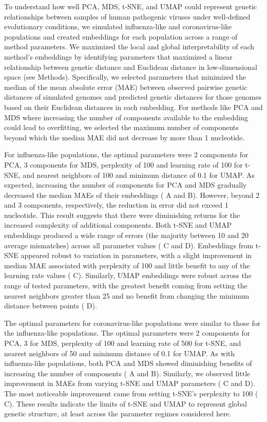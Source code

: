 \documentclass[10pt,letterpaper]{article}
\begin{document}
To understand how well PCA, MDS, t-SNE, and UMAP could represent genetic relationships between samples of human pathogenic viruses under well-defined evolutionary conditions, we simulated influenza-like and coronavirus-like populations and created embeddings for each population across a range of method parameters.
We maximized the local and global interpretability of each method's embeddings by identifying parameters that maximized a linear relationship between genetic distance and Euclidean distance in low-dimensional space (see Methods).
Specifically, we selected parameters that minimized the median of the mean absolute error (MAE) between observed pairwise genetic distances of simulated genomes and predicted genetic distances for those genomes based on their Euclidean distances in each embedding.
For methods like PCA and MDS where increasing the number of components available to the embedding could lead to overfitting, we selected the maximum number of components beyond which the median MAE did not decrease by more than 1 nucleotide.

For influenza-like populations, the optimal parameters were 2 components for PCA, 3 components for MDS, perplexity of 100 and learning rate of 100 for t-SNE, and nearest neighbors of 100 and minimum distance of 0.1 for UMAP.
As expected, increasing the number of components for PCA and MDS gradually decreased the median MAEs of their embeddings ( A and B).
However, beyond 2 and 3 components, respectively, the reduction in error did not exceed 1 nucleotide.
This result suggests that there were diminishing returns for the increased complexity of additional components.
Both t-SNE and UMAP embeddings produced a wide range of errors (the majority between 10 and 20 average mismatches) across all parameter values ( C and D).
Embeddings from t-SNE appeared robust to variation in parameters, with a slight improvement in median MAE associated with perplexity of 100 and little benefit to any of the learning rate values ( C).
Similarly, UMAP embeddings were robust across the range of tested parameters, with the greatest benefit coming from setting the nearest neighbors greater than 25 and no benefit from changing the minimum distance between points ( D).

The optimal parameters for coronavirus-like populations were similar to those for the influenza-like populations.
The optimal parameters were 2 components for PCA, 3 for MDS, perplexity of 100 and learning rate of 500 for t-SNE, and nearest neighbors of 50 and minimum distance of 0.1 for UMAP.
As with influenza-like populations, both PCA and MDS showed diminishing benefits of increasing the number of components ( A and B).
Similarly, we observed little improvement in MAEs from varying t-SNE and UMAP parameters ( C and D).
The most noticeable improvement came from setting t-SNE's perplexity to 100 ( C).
These results indicate the limits of t-SNE and UMAP to represent global genetic structure, at least across the parameter regimes considered here.
\end{document}
